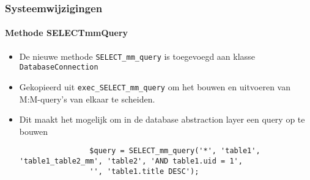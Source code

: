 \begin{frame}[fragile]
	\frametitle{Systeemwijzigingen}
	\framesubtitle{Methode SELECTmmQuery}

	\lstset{basicstyle=\tiny\ttfamily}

	\begin{itemize}

		\item De nieuwe methode \texttt{SELECT\_mm\_query} is toegevoegd aan klasse \texttt{DatabaseConnection}

		\item Gekopieerd uit \texttt{exec\_SELECT\_mm\_query} om het bouwen en uitvoeren van M:M-query's van elkaar te scheiden.

		\item Dit maakt het mogelijk om in de database abstraction layer een query op te bouwen

			\begin{lstlisting}
				$query = SELECT_mm_query('*', 'table1', 'table1_table2_mm', 'table2', 'AND table1.uid = 1',
				'', 'table1.title DESC');
			\end{lstlisting}

	\end{itemize}

\end{frame}


